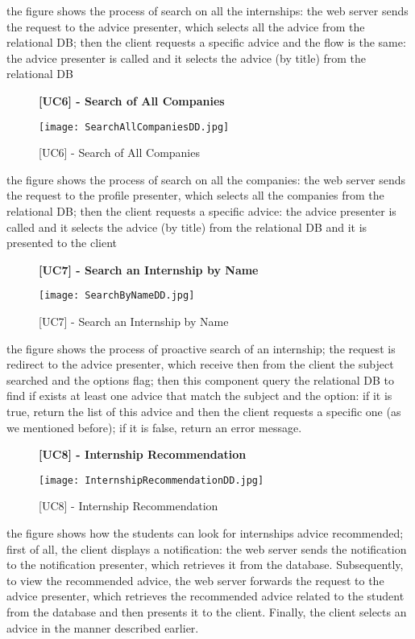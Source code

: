 		
		the figure shows the process of search on all the internships: the web server sends the request to the advice presenter, which selects all the advice from the relational DB; then the client requests a specific advice and the flow is the same: the advice presenter is called and it selects the advice (by title) from the relational DB
		
		\begin{figure}[H]
			\centering
			{\bfseries [UC6] - Search of All Companies}
			\caption{[UC6] - Search of All Companies}
			\texttt{[image: SearchAllCompaniesDD.jpg]}
			
		\end{figure}
		
		
		the figure shows the process of search on all the companies: the web server sends the request to the profile presenter, which selects all the companies from the relational DB; then the client requests a specific advice: the advice presenter is called and it selects the advice (by title) from the relational DB and it is presented to the client
		
		\begin{figure}[H]
			\centering
			{\bfseries [UC7] - Search an Internship by Name}
			\caption{[UC7] - Search an Internship by Name}
			\texttt{[image: SearchByNameDD.jpg]}
			
		\end{figure}
		
		the figure shows the process of proactive search of an internship; the request is redirect to the advice presenter, which receive then from the client the subject searched and the options flag; then this component query the relational DB to find if exists at least one advice that match the subject and the option: if it is true, return the list of this advice and then the client requests a specific one (as we mentioned before); if it is false, return an error message.
		
		
		\begin{figure}[H]
			\centering
			{\bfseries [UC8] - Internship Recommendation}
			\caption{[UC8] - Internship Recommendation}
			\texttt{[image: InternshipRecommendationDD.jpg]}
			
		\end{figure}
		
		the figure shows how the students can look for internships advice recommended; first of all, the client displays a notification: the web server sends the notification to the notification presenter, which retrieves it from the database. Subsequently, to view the recommended advice, the web server forwards the request to the advice presenter, which retrieves the recommended advice related to the student from the database and then presents it to the client. Finally, the client selects an advice in the manner described earlier.
		
